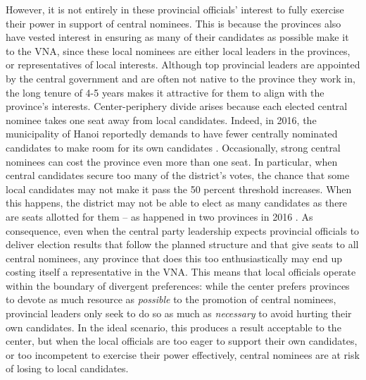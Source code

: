 \documentclass[12pt]{article}
\newcommand{\1}{\mathbbm{1}}
\begin{document}
However, it is not entirely in these provincial officials' interest to fully exercise their power in support of central nominees. This is because the provinces also have vested interest in ensuring as many of their candidates as possible make it to the VNA, since these local nominees are either local leaders in the provinces, or representatives of local interests. Although top provincial leaders are appointed by the central government and are often not native to the province they work in, the long tenure of 4-5 years makes it attractive for them to align with the province's interests. Center-periphery divide arises because each elected central nominee takes one seat away from local candidates. Indeed, in 2016, the municipality of Hanoi reportedly demands to have fewer centrally nominated candidates to make room for its own candidates \citep{vnexpress2016_2}. Occasionally, strong central nominees can cost the province even more than one seat. In particular, when central candidates secure too many of the district's votes, the chance that some local candidates may not make it pass the 50 percent threshold increases. When this happens, the district may not be able to elect as many candidates as there are seats allotted for them -- as happened in two provinces in 2016 \citep{vnexpress2016}. As consequence, even when the central party leadership expects provincial officials to deliver election results that follow the planned structure and that give seats to all central nominees, any province that does this too enthusiastically may end up costing itself a representative in the VNA. This means that local officials operate within the boundary of divergent preferences: while the center prefers provinces to devote as much resource as \textit{possible} to the promotion of central nominees, provincial leaders only seek to do so as much as \textit{necessary} to avoid hurting their own candidates. In the ideal scenario, this produces a result acceptable to the center, but when the local officials are too eager to support their own candidates, or too incompetent to exercise their power effectively, central nominees are at risk of losing to local candidates.
\end{document}
